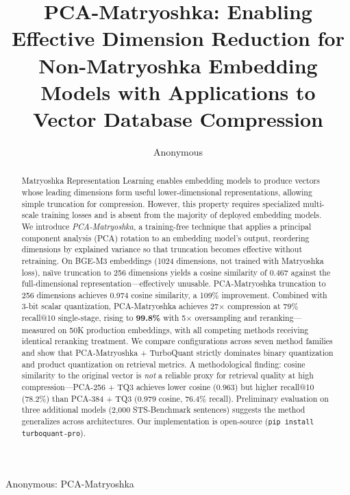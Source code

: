 \documentclass[journal]{IEEEtran}
\begin{document}
\title{PCA-Matryoshka: Enabling Effective Dimension Reduction for Non-Matryoshka Embedding Models with Applications to Vector Database Compression}

\author{Anonymous}

%
{Anonymous: PCA-Matryoshka}

\maketitle

\begin{abstract}
Matryoshka Representation Learning enables embedding models to produce vectors whose leading dimensions form useful lower-dimensional representations, allowing simple truncation for compression.
However, this property requires specialized multi-scale training losses and is absent from the majority of deployed embedding models.
We introduce \emph{PCA-Matryoshka}, a training-free technique that applies a principal component analysis (PCA) rotation to an embedding model's output, reordering dimensions by explained variance so that truncation becomes effective without retraining.
On BGE-M3 embeddings (1024 dimensions, not trained with Matryoshka loss), na\"{\i}ve truncation to 256 dimensions yields a cosine similarity of 0.467 against the full-dimensional representation---effectively unusable.
PCA-Matryoshka truncation to 256 dimensions achieves 0.974 cosine similarity, a 109\% improvement.
Combined with 3-bit scalar quantization, PCA-Matryoshka achieves 27$\times$ compression at 79\% recall@10 single-stage, rising to \textbf{99.8\%} with 5$\times$ oversampling and reranking---measured on 50K production embeddings, with all competing methods receiving identical reranking treatment.
We compare configurations across seven method families and show that PCA-Matryoshka + TurboQuant strictly dominates binary quantization and product quantization on retrieval metrics.
A methodological finding: cosine similarity to the original vector is \emph{not} a reliable proxy for retrieval quality at high compression---PCA-256 + TQ3 achieves lower cosine (0.963) but higher recall@10 (78.2\%) than PCA-384 + TQ3 (0.979 cosine, 76.4\% recall).
Preliminary evaluation on three additional models (2{,}000 STS-Benchmark sentences) suggests the method generalizes across architectures.
Our implementation is open-source (\texttt{pip install turboquant-pro}).
\end{abstract}
\end{document}
